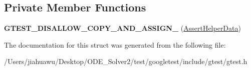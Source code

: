 \subsection*{Private Member Functions}
\begin{DoxyCompactItemize}
\item 
\mbox{\label{structtesting_1_1internal_1_1_assert_helper_1_1_assert_helper_data_a5cfdd2fca371e33566ffdb2357606df2}} 
{\bfseries G\+T\+E\+S\+T\+\_\+\+D\+I\+S\+A\+L\+L\+O\+W\+\_\+\+C\+O\+P\+Y\+\_\+\+A\+N\+D\+\_\+\+A\+S\+S\+I\+G\+N\+\_\+} (\mbox{\hyperlink{structtesting_1_1internal_1_1_assert_helper_1_1_assert_helper_data}{Assert\+Helper\+Data}})
\end{DoxyCompactItemize}


The documentation for this struct was generated from the following file\+:\begin{DoxyCompactItemize}
\item 
/\+Users/jiahuawu/\+Desktop/\+O\+D\+E\+\_\+\+Solver2/test/googletest/include/gtest/gtest.\+h\end{DoxyCompactItemize}
